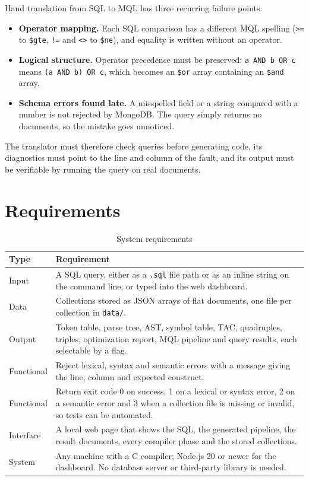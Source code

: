 \documentclass[12pt,a4paper]{report}
\newcommand{\codeus}{\textunderscore\allowbreak}
\DeclareRobustCommand{\code}[1]{\texttt{\let\_\codeus #1}}
\begin{document}
Hand translation from SQL to MQL has three recurring failure points:
\begin{itemize}
  \item \textbf{Operator mapping.} Each SQL comparison has a different MQL spelling (\code{>=} to \code{\$gte}, \code{!=} and \code{<>} to \code{\$ne}), and equality is written without an operator.
  \item \textbf{Logical structure.} Operator precedence must be preserved: \code{a AND b OR c} means \code{(a AND b) OR c}, which becomes an \code{\$or} array containing an \code{\$and} array.
  \item \textbf{Schema errors found late.} A misspelled field or a string compared with a number is not rejected by MongoDB. The query simply returns no documents, so the mistake goes unnoticed.
\end{itemize}
The translator must therefore check queries before generating code, its diagnostics must point to the line and column of the fault, and its output must be verifiable by running the query on real documents.

\section{Requirements}
\begin{table}[H]
\centering\small
\begin{tabularx}{\linewidth}{|P{2.6cm}|L|}
\hline
\textbf{Type} & \textbf{Requirement} \\ \hline
Input & A SQL query, either as a \code{.sql} file path or as an inline string on the command line, or typed into the web dashboard. \\ \hline
Data & Collections stored as JSON arrays of flat documents, one file per collection in \code{data/}. \\ \hline
Output & Token table, parse tree, AST, symbol table, TAC, quadruples, triples, optimization report, MQL pipeline and query results, each selectable by a flag. \\ \hline
Functional & Reject lexical, syntax and semantic errors with a message giving the line, column and expected construct. \\ \hline
Functional & Return exit code 0 on success, 1 on a lexical or syntax error, 2 on a semantic error and 3 when a collection file is missing or invalid, so tests can be automated. \\ \hline
Interface & A local web page that shows the SQL, the generated pipeline, the result documents, every compiler phase and the stored collections. \\ \hline
System & Any machine with a C compiler; Node.js 20 or newer for the dashboard. No database server or third-party library is needed. \\ \hline
\end{tabularx}
\caption{System requirements}
\end{table}
\end{document}
